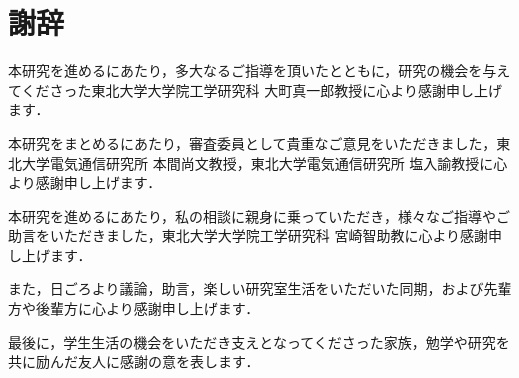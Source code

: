 \chapter*{謝辞}

本研究を進めるにあたり，多大なるご指導を頂いたとともに，研究の機会を与えてくださった東北大学大学院工学研究科 大町真一郎教授に心より感謝申し上げます．

本研究をまとめるにあたり，審査委員として貴重なご意見をいただきました，東北大学電気通信研究所 本間尚文教授，東北大学電気通信研究所 塩入諭教授に心より感謝申し上げます．

本研究を進めるにあたり，私の相談に親身に乗っていただき，様々なご指導やご助言をいただきました，東北大学大学院工学研究科 宮崎智助教に心より感謝申し上げます．

また，日ごろより議論，助言，楽しい研究室生活をいただいた同期，および先輩方や後輩方に心より感謝申し上げます．

最後に，学生生活の機会をいただき支えとなってくださった家族，勉学や研究を共に励んだ友人に感謝の意を表します．